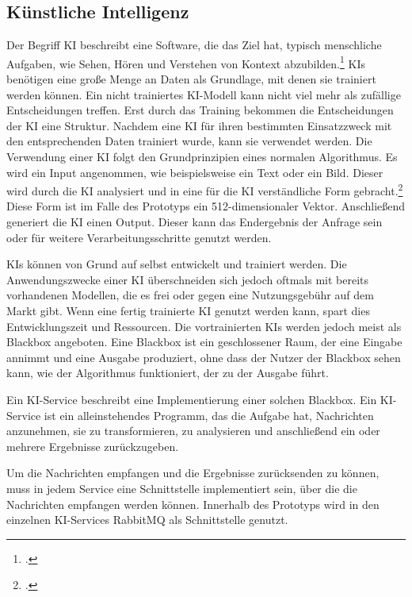 \subsection{Künstliche Intelligenz}
Der Begriff KI beschreibt eine Software, die das Ziel hat, typisch menschliche Aufgaben, wie Sehen, Hören und Verstehen von Kontext abzubilden.\footcite{gorz2010handbuch} 
KIs benötigen eine große Menge an Daten als Grundlage, mit denen sie trainiert werden können. Ein nicht trainiertes KI-Modell kann nicht viel mehr als zufällige Entscheidungen treffen. Erst durch das Training bekommen die Entscheidungen der KI eine Struktur. Nachdem eine KI für ihren bestimmten Einsatzzweck mit den entsprechenden Daten trainiert wurde, kann sie verwendet werden. Die Verwendung einer KI folgt den Grundprinzipien eines normalen Algorithmus. Es wird ein Input angenommen, wie beispielsweise ein Text oder ein Bild. Dieser wird durch die KI analysiert und in eine für die KI verständliche Form gebracht.\footcite{hamet2017artificial} Diese Form ist im Falle des Prototyps ein 512-dimensionaler Vektor. Anschließend generiert die KI einen Output. Dieser kann das Endergebnis der Anfrage sein oder für weitere Verarbeitungsschritte genutzt werden.

KIs können von Grund auf selbst entwickelt und trainiert werden. Die Anwendungszwecke einer KI überschneiden sich jedoch oftmals mit bereits vorhandenen Modellen, die es frei oder gegen eine Nutzungsgebühr auf dem Markt gibt. Wenn eine fertig trainierte KI genutzt werden kann, spart dies Entwicklungszeit und Ressourcen. Die vortrainierten KIs werden jedoch meist als Blackbox angeboten. Eine Blackbox ist ein geschlossener Raum, der eine Eingabe annimmt und eine Ausgabe produziert, ohne dass der Nutzer der Blackbox sehen kann, wie der Algorithmus funktioniert, der zu der Ausgabe führt.  

Ein KI-Service beschreibt eine Implementierung einer solchen Blackbox. Ein KI-Service ist ein alleinstehendes Programm, das die Aufgabe hat, Nachrichten anzunehmen, sie zu transformieren, zu analysieren und anschließend ein oder mehrere Ergebnisse zurückzugeben. 

Um die Nachrichten empfangen und die Ergebnisse zurücksenden zu können, muss in jedem Service eine Schnittstelle implementiert sein, über die die Nachrichten empfangen werden können. Innerhalb des Prototyps wird in den einzelnen KI-Services RabbitMQ als Schnittstelle genutzt.

